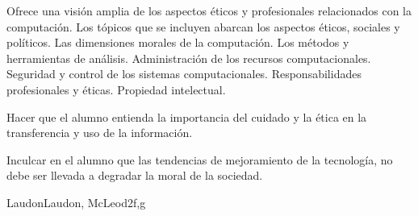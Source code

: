 \begin{syllabus}


\begin{justification}
Ofrece una visión amplia de los aspectos éticos y profesionales relacionados con la computación. Los tópicos que se incluyen abarcan los aspectos éticos, sociales y políticos. Las dimensiones morales de la computación. Los métodos y herramientas de análisis. Administración de los recursos computacionales. Seguridad y control de los sistemas computacionales. Responsabilidades profesionales y éticas. Propiedad intelectual.
\end{justification}

\begin{goals}
\item Hacer que el alumno entienda la importancia del cuidado y la ética en la transferencia y uso de la información.
\item Inculcar en el alumno que las tendencias de mejoramiento de la tecnología, no debe ser llevada a degradar la moral de la sociedad.
\end{goals}


\begin{unit}{\SPHistory}{}{LaudonLaudon, McLeod}{2}{f,g}
    \begin{topics}
    	\item \SPHistoryTopicPrehistory
        \item \SPHistoryTopicHistory
        \item \SPHistoryTopicPioneers
        \item \SPHistoryTopicHistoryOf
    \end{topics}
    \begin{learningoutcomes}%
        \item \SPHistoryLOIdentifySignificant [\Familiarity]
        \item \SPHistoryLOIdentifyTheSeveral [\Familiarity]
        \item \SPHistoryLODiscussTheForLanguage [\Familiarity]
        \item \SPHistoryLOCompareDaily [\Familiarity]
    \end{learningoutcomes}
\end{unit}


\end{syllabus}
